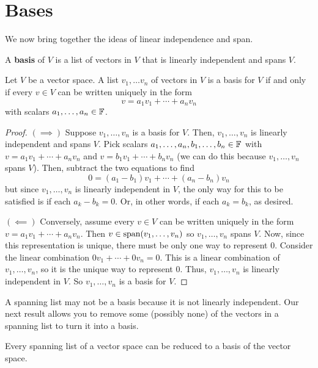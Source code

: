 \section{Bases}
We now bring together the ideas of linear independence and span.
\begin{definition}[Basis]
    A \textbf{basis} of $V$ is a list of vectors in $V$ that is linearly independent and spans $V$.
\end{definition}
\begin{theorem}
    Let $V$ be a vector space. A list $v_1,\dots v_n$ of vectors in $V$ is a basis for $V$ if and only if every $v\in V$ can be written uniquely in the form
    \[ v = a_1v_1 + \cdots + a_nv_n\]
    with scalars $a_1, \dots, a_n\in \mathbb F$.
\end{theorem}
\begin{proof}
    $(\implies)$ Suppose $v_1,\dots, v_n$ is a basis for $V$. Then, $v_1, \dots, v_n$ is linearly independent and spans $V$. Pick scalars $a_1, \dots, a_n, b_1, \dots, b_n \in \mathbb F$ with $v = a_1v_1 + \cdots + a_nv_n$ and $v = b_1v_1 + \cdots + b_nv_n$ (we can do this because $v_1, \dots, v_n$ spans $V$). Then, subtract the two equations to find
    \[ 0 = (a_1-b_1)v_1 + \cdots + (a_n-b_n)v_n\]
    but since $v_1, \dots, v_n$ is linearly independent in $V$, the only way for this to be satisfied is if each $a_k-b_k=0$. Or, in other words, if each $a_k = b_k$, as desired.

    $(\impliedby)$ Conversely, assume every $v\in V$ can be written uniquely in the form $v = a_1v_1 + \cdots + a_nv_n$. Then $v\in\operatorname{span}(v_1, \dots, v_n)$ so $v_1, \dots, v_n$ spans $V$. Now, since this representation is unique, there must be only one way to represent $0$. Consider the linear combination $0v_1 + \cdots + 0v_n = 0$. This is a linear combination of $v_1, \dots, v_n$, so it is the unique way to represent $0$. Thus, $v_1, \dots, v_n$ is linearly independent in $V$. So $v_1, \dots, v_n$ is a basis for $V$.
\end{proof}
A spanning list may not be a basis because it is not linearly independent. Our next result allows you to remove some (possibly none) of the vectors in a spanning list to turn it into a basis. 
\begin{theorem}
    Every spanning list of a vector space can be reduced to a basis of the vector space.
\end{theorem}
